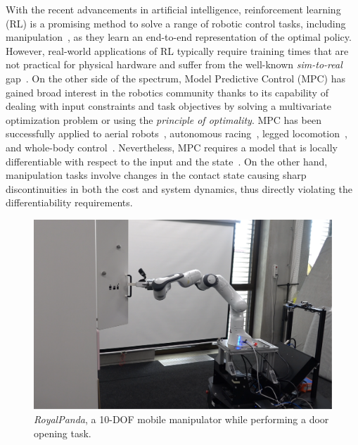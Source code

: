 With the recent advancements in artificial intelligence, reinforcement learning (RL) is a promising method to solve a range of robotic control tasks, including manipulation~\cite{finn2016deep}, as they learn an end-to-end representation of the optimal policy. However, real-world applications of RL typically require training times that are not practical for physical hardware and suffer from the well-known \textit{sim-to-real} gap~\cite{chebotar2019closing}. 
On the other side of the spectrum, Model Predictive Control (MPC) has gained broad interest in the robotics community thanks to its capability of dealing with input constraints and task objectives by solving a multivariate optimization problem or using the \textit{principle of optimality}. 
MPC has been successfully applied to aerial robots~\cite{brunner2020trajectory}, autonomous racing~\cite{liniger2015optimization}, legged locomotion~\cite{grandia2019frequency}, and whole-body control~\cite{minniti2019whole}. 
Nevertheless, MPC requires a model that is locally differentiable with respect to the input and the state~\cite{buchli2017optimal}. On the other hand, manipulation tasks involve changes in the contact state causing sharp discontinuities in both the cost and system dynamics, thus directly violating the differentiability requirements. 


\begin{figure}[t]
\centering
\includegraphics[trim={0 0 0 100},clip,width=0.9\columnwidth]{framework_manipulation/figures/hardware/system_figure.pdf}
\caption{\textit{RoyalPanda}, a 10-DOF mobile manipulator while performing a door opening task.} \label{fig:royal_panda}
\end{figure}

